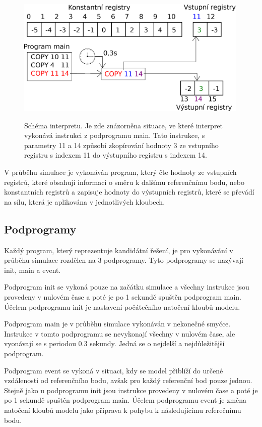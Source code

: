 \begin{figure}[h]
    \centering
    {\includegraphics[width=30em]{obrazky-figures/interpret.eps}}
    \caption{
    Schéma interpretu.
    Je zde znázorněna situace, ve které interpret vykonává instrukci z podprogramu main.
    Tato instrukce, s parametry 11 a 14 způsobí zkopírování hodnoty 3 ze vstupního registru s indexem 11 do výstupního registru s indexem 14.
    }
    \label{fig:interpret}
\end{figure}

V průběhu simulace je vykonáván program, který čte hodnoty ze vstupních registrů, které obsahují informaci o směru k dalšímu referenčnímu bodu, nebo konstantních registrů a zapisuje hodnoty do výstupních registrů, které se převádí na sílu, která je aplikována v jednotlivých kloubech.

\subsection{Podprogramy}

Každý program, který reprezentuje kandidátní řešení, je pro vykonávání v průběhu simulace rozdělen na 3 podprogramy.
Tyto podprogramy se nazývají init, main a event.

Podprogram init se vykoná pouze na začátku simulace a všechny instrukce jsou provedeny v nulovém čase a poté je po 1 sekundě spuštěn podprogram main.
Účelem podprogramu init je nastavení počátečního natočení kloubů modelu.

Podprogram main je v průběhu simulace vykonáván v nekonečné smyčce.
Instrukce v tomto podprogramu se nevykonají všechny v nulovém čase, ale vyonávají se s periodou 0.3 sekundy.
Jedná se o nejdelší a nejdůležitější podprogram.

Podprogram event se vykoná v situaci, kdy se model přiblíží do určené vzdálenosti od referenčního bodu, avšak pro každý referenční bod pouze jednou.
Stejně jako u podprogramu init jsou instrukce provedeny v nulovém čase a poté je po 1 sekundě spuštěn podprogram main.
Účelem podprogramu event je změna natočení kloubů modelu jako příprava k pohybu k následujícímu referečnímu bodu.

